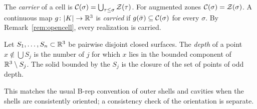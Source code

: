 \begin{definition}[Carriers]
The \emph{carrier} of a cell is $\mathcal{C}(\sigma)=\bigcup_{\tau\le\sigma}\mathcal{Z}(\tau)$. For augmented zones
$\mathcal{C}(\sigma)=\mathcal{Z}(\sigma)$. A continuous map $g\colon|K|\to\mathbb{R}^3$ is \emph{carried} if $g(\bar\sigma)\subseteq
\mathcal{C}(\sigma)$ for every $\sigma$. By Remark~\ref{rem:opencell}, every realization is carried.
\end{definition}

\begin{definition}[Solid]\label{def:solid}
Let $S_1,\dots,S_n\subset\mathbb{R}^3$ be pairwise disjoint closed surfaces. The \emph{depth} of a point $x\notin\bigcup S_j$
is the number of $j$ for which $x$ lies in the bounded component of $\mathbb{R}^3\setminus S_j$. The solid bounded by
the $S_j$ is the closure of the set of points of odd depth.
\end{definition}
This matches the usual B-rep convention of outer shells and cavities when the shells are consistently oriented;
a consistency check of the orientation is separate.
